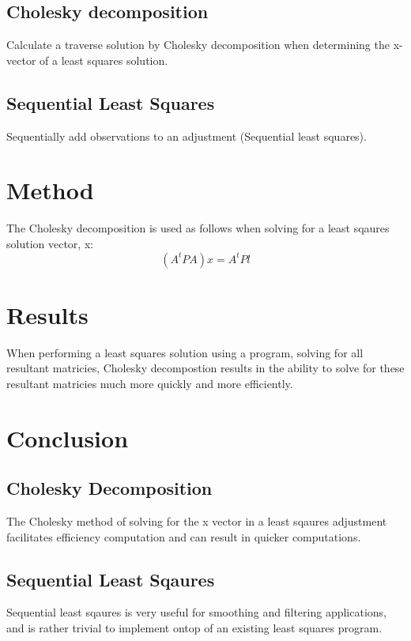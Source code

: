 \documentclass{article}
\begin{document}
\subsection{Cholesky decomposition}
Calculate a traverse solution by Cholesky decomposition when determining the x-vector of a least squares solution.

\subsection{Sequential Least Squares}
Sequentially add observations to an adjustment (Sequential least squares).

\section{Method}
The Cholesky decomposition is used as follows when solving for a least sqaures solution vector, x: 
\[ (A^t P A)x = A^t P l \]

\section{Results}
When performing a least squares solution using a program, solving for all resultant matricies, Cholesky decompostion results
in the ability to solve for these resultant matricies much more quickly and more efficiently.

\section{Conclusion}
\subsection{Cholesky Decomposition}
The Cholesky method of solving for the x vector in a least sqaures adjustment facilitates efficiency computation and 
can result in quicker computations.

\subsection{Sequential Least Sqaures}
Sequential least sqaures is very useful for smoothing and filtering applications, and is rather trivial to implement ontop
of an existing least squares program.
\end{document}
